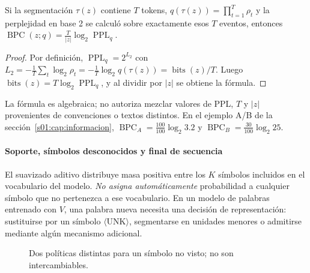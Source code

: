 \begin{proposicion}\label{s01:prop:pplbpc}
Si la segmentación $\tau(z)$ contiene $T$ tokens, $q(\tau(z))=\prod_{t=1}^T\rho_t$
y la perplejidad en base 2 se calculó sobre exactamente esos $T$ eventos, entonces
$\operatorname{BPC}(z;q)=\frac{T}{|z|}\log_2\operatorname{PPL}_q$.
\end{proposicion}
\begin{proof}
Por definición, $\operatorname{PPL}_q=2^{L_2}$ con
$L_2=-\frac1T\sum_t\log_2\rho_t=-\frac1T\log_2q(\tau(z))=\operatorname{bits}(z)/T$.
Luego $\operatorname{bits}(z)=T\log_2\operatorname{PPL}_q$, y al dividir por $|z|$
se obtiene la fórmula.
\end{proof}
\noindent La fórmula es algebraica; no autoriza mezclar valores de PPL, $T$ y $|z|$
provenientes de convenciones o textos distintos. En el ejemplo A/B de la
sección~\ref{s01:cap:informacion}, $\operatorname{BPC}_A=\frac{100}{100}\log_2 3.2$
y $\operatorname{BPC}_B=\frac{30}{100}\log_2 25$.

\paragraph{Soporte, símbolos desconocidos y final de secuencia}

El suavizado aditivo distribuye masa positiva entre los $K$ símbolos
incluidos en el vocabulario del modelo. \emph{No asigna automáticamente}
probabilidad a cualquier símbolo que no pertenezca a ese vocabulario.
En un modelo de palabras entrenado con $V$, una palabra nueva necesita
una decisión de representación: sustituirse por un símbolo
$\langle\mathrm{UNK}\rangle$, segmentarse en unidades menores o
admitirse mediante algún mecanismo adicional.

\begin{figure}[H]\centering
{}
\caption{Dos políticas distintas para un símbolo no visto; no son intercambiables.}
\end{figure}

